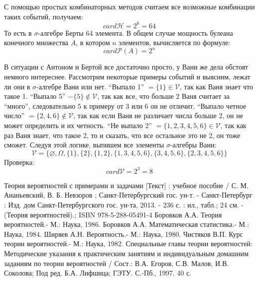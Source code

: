 \begin{exmp}
	С помощью простых комбинаторных методов считаем все возможные комбинации таких событий, получаем:
	\[ card\mathcal{H}=2^6=64 \]
	То есть в $\sigma$-алгебре Берты 64 элемента. В общем случае мощность булеана конечного множества $A$, в котором $n$ элементов, вычисляется по формуле:
	\[ card \mathcal{P} (A) = 2^n \]
	
	В ситуации с Антоном и Бертой все достаточно просто, у Вани же дела обстоят немного интереснее. Рассмотрим некоторые примеры событий и выясним, лежат ли они в $\sigma$-алгебре Вани или нет. “Выпало 1” $= \{ 1 \} \in \mathcal{V}$, так как Ваня знает что такое 1. “Выпало 5” $- \{ 5 \} \notin \mathcal{V}$, так как все, что больше 2 Ваня считает за “много”, следовательно 5 к примеру от 3 или 6 он не отличит. “Выпало четное число” $=\{ 2, 4, 6 \} \notin \mathcal{V}$, так как если Ваня не различает числа больше 2, он не может определить и их четность. “Не выпало 2” $=\{ 1, 2, 3, 4, 5, 6 \} \in \mathcal{V}$, так как раз Ваня знает, что такое 2, то и сказать, что все остальное это не 2, он тоже сможет. Следуя этой логике, выпишем все элементы $\sigma$-алгебры Вани:
	\[ \mathcal{V}=\{\varnothing,\Omega,\{1\},\{2\},\{1,2\},\{1,3,4,5,6\},\{3,4,5,6\},\{2,3,4,5,6\}\} \]
	Проверка:
	\[ card \mathcal{V} = 2^3 = 8 \]
\end{exmp}

\newpage

\begin{thebibliography}{6}
	Теория вероятностей с примерами и задачами [Текст] : учебное пособие / С. М. Ананьевский, В. Б. Невзоров ; Санкт-Петербургский гос. ун-т. - Санкт-Петербург : Изд. дом Санкт-Петербургского гос. ун-та, 2013. - 236 с. : ил., табл.; 24 см. - (Теория вероятностей).; ISBN 978-5-288-05491-4
	Боровков А.А. Теория вероятностей.- М.: Наука, 1986.
	Боровков А.А. Математическая статистика.- М.: Наука, 1984.
	Ширяев А.Н. Вероятность.- М.: Наука, 1980.
	Чистяков В.П. Курс теории вероятностей.- М.: Наука, 1982.
	Специальные главы теории вероятностей: Методические указания к практическим занятиям и индивидуальным домашним заданиям по теории вероятностей / Сост.: В.А. Егоров, С.В. Малов, И.В. Соколова; Под ред. Б.А. Лифшица; ГЭТУ. С.-Пб., 1997. 40 с.
\end{thebibliography}

